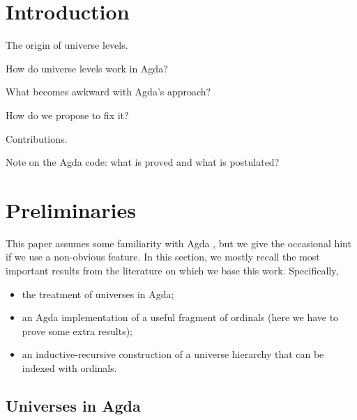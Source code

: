 \documentclass[manuscript,screen,review,anonymous]{acmart}
\begin{document}
\maketitle

\section{Introduction}
\label{sec:introduction}

The origin of universe levels.

How do universe levels work in Agda?

What becomes awkward with Agda's approach?

How do we propose to fix it?

Contributions.

Note on the Agda code: what is proved and what is postulated?

\section{Preliminaries}
\label{sec:preliminaries}

This paper assumes some familiarity with Agda
\cite{DBLP:conf/icfp/Norell13}, but we give the occasional hint if we
use a non-obvious feature. In this section, we mostly recall the most
important results from the literature on which we base this
work. Specifically,
\begin{itemize}
\item the treatment of universes in Agda;
\item an Agda implementation of a useful fragment of ordinals (here we
  have to prove some extra results);
\item an inductive-recursive construction of a universe hierarchy that
  can be indexed with ordinals.
\end{itemize}

\subsection{Universes in Agda}
\label{sec:universes-agda}
\end{document}
